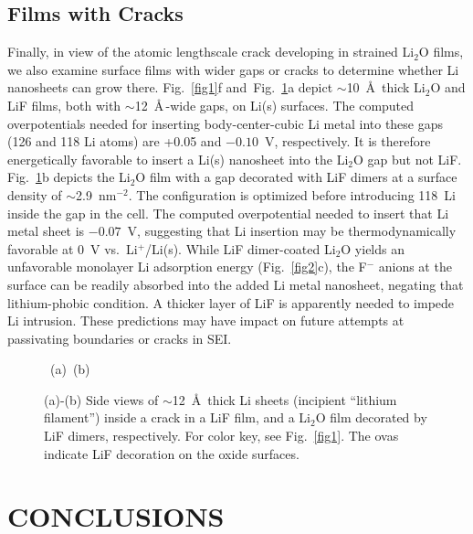 \documentclass[prb,preprint,amsmath,amssymb]{revtex4}
\begin{document}
\subsection*{Films with Cracks}

Finally, in view of the atomic lengthscale crack developing in strained Li$_2$O
films, we also examine surface films with wider gaps or cracks to determine
whether Li nanosheets can grow there.  Fig.~\ref{fig1}f and~Fig.~\ref{fig7}a
depict $\sim$10~\AA\, thick Li$_2$O and LiF films, both with
$\sim$12~\AA\,-wide gaps, on Li(s) surfaces.  The computed overpotentials
needed for inserting body-center-cubic Li metal into these gaps (126 and 118
Li atoms) are +0.05 and $-0.10$~V, respectively.  It is therefore energetically
favorable to insert a Li(s) nanosheet into the Li$_2$O gap but not LiF.
Fig.~\ref{fig7}b depicts the Li$_2$O film with a gap decorated with LiF dimers
at a surface density of $\sim$2.9~nm$^{-2}$.  The configuration is optimized
before introducing 118~Li inside the gap in the cell. The computed overpotential
needed to insert that Li metal sheet is $-0.07$~V, suggesting that Li insertion
may be thermodynamically favorable at 0~V vs.~Li$^+$/Li(s).  While LiF
dimer-coated Li$_2$O yields an unfavorable monolayer Li adsorption energy
(Fig.~\ref{fig2}c), the F$^-$ anions at the surface can be readily absorbed
into the added Li metal nanosheet, negating that lithium-phobic condition.  A
thicker layer of LiF is apparently needed to impede Li intrusion.  These
predictions may have impact on future attempts at passivating boundaries or
cracks in SEI.

\begin{figure}
\centerline{\hbox{ \epsfxsize=2.20in  (a)  
		   \epsfxsize=2.20in  (b)}}
\caption[]
{\label{fig7} \noindent
(a)-(b) Side views of $\sim$12~\AA\, thick Li sheets (incipient ``lithium
filament'') inside a crack in a LiF film, and a Li$_2$O film decorated by
LiF dimers, respectively.  For color key, see Fig.~\ref{fig1}.
The ovas indicate LiF decoration on the oxide surfaces.
}
\end{figure}

\section*{CONCLUSIONS}
\end{document}
